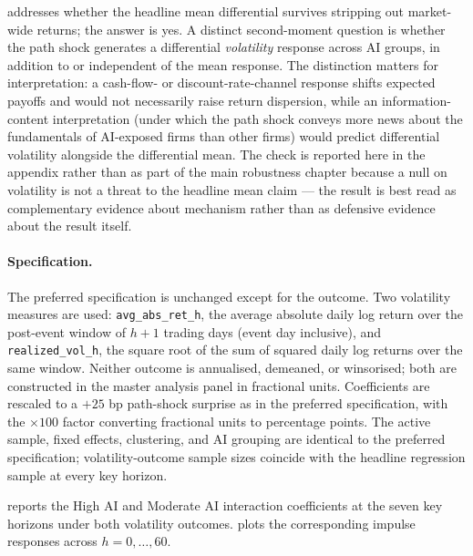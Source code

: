  addresses whether the headline mean
differential survives stripping out market-wide returns; the answer is
yes. A distinct second-moment question is whether the path shock
generates a differential \emph{volatility} response across AI groups,
in addition to or independent of the mean response. The distinction
matters for interpretation: a cash-flow- or discount-rate-channel
response shifts expected payoffs and would not necessarily raise
return dispersion, while an information-content interpretation
(under which the path shock conveys more news about the fundamentals
of AI-exposed firms than other firms) would predict differential
volatility alongside the differential mean. The check is reported
here in the appendix rather than as part of the main robustness
chapter because a null on volatility is not a threat to the
headline mean claim --- the result is best read as complementary
evidence about mechanism rather than as defensive evidence about
the result itself.

\paragraph{Specification.} The preferred specification is unchanged
except for the outcome. Two volatility measures are used:
\texttt{avg\_abs\_ret\_h}, the average absolute daily log return over
the post-event window of $h+1$ trading days (event day inclusive),
and \texttt{realized\_vol\_h}, the square root of the sum of squared
daily log returns over the same window. Neither outcome is
annualised, demeaned, or winsorised; both are constructed in the
master analysis panel in fractional units. Coefficients are rescaled
to a $+25$ bp path-shock surprise as in the preferred specification,
with the $\times 100$ factor converting fractional units to
percentage points. The active sample, fixed effects, clustering, and
AI grouping are identical to the preferred specification;
volatility-outcome sample sizes coincide with the headline regression
sample at every key horizon.

 reports the High AI and Moderate AI
interaction coefficients at the seven key horizons under both
volatility outcomes.  plots the
corresponding impulse responses across $h = 0,\ldots,60$.

\begin{table}[htbp]
\centering\small
\caption[Volatility outcomes: key-horizon estimates]{Volatility
outcomes: key-horizon estimates}
\label{tab:volatility_key}

\end{table}

